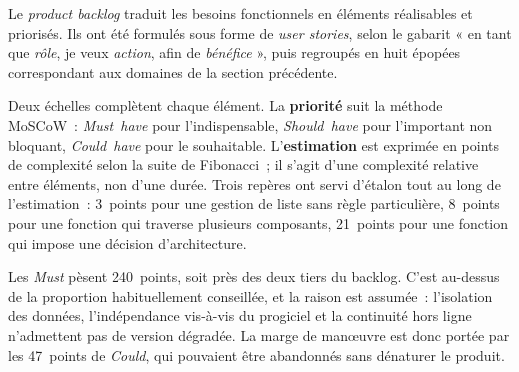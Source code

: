 Le \emph{product backlog} traduit les besoins fonctionnels en éléments réalisables et priorisés. Ils
ont été formulés sous forme de \emph{user stories}, selon le gabarit « en tant que \emph{rôle}, je
veux \emph{action}, afin de \emph{bénéfice} », puis regroupés en huit épopées correspondant aux
domaines de la section précédente.

Deux échelles complètent chaque élément. La \textbf{priorité} suit la méthode MoSCoW~:
\emph{Must~have} pour l'indispensable, \emph{Should~have} pour l'important non bloquant,
\emph{Could~have} pour le souhaitable. L'\textbf{estimation} est exprimée en points de complexité
selon la suite de Fibonacci~; il s'agit d'une complexité relative entre éléments, non d'une durée.
Trois repères ont servi d'étalon tout au long de l'estimation~: 3~points pour une gestion de liste
sans règle particulière, 8~points pour une fonction qui traverse plusieurs composants, 21~points
pour une fonction qui impose une décision d'architecture.

Les \emph{Must} pèsent 240~points, soit près des deux tiers du backlog. C'est au-dessus de la
proportion habituellement conseillée, et la raison est assumée~: l'isolation des données,
l'indépendance vis-à-vis du progiciel et la continuité hors ligne n'admettent pas de version
dégradée. La marge de manœuvre est donc portée par les 47~points de \emph{Could}, qui pouvaient
être abandonnés sans dénaturer le produit.

